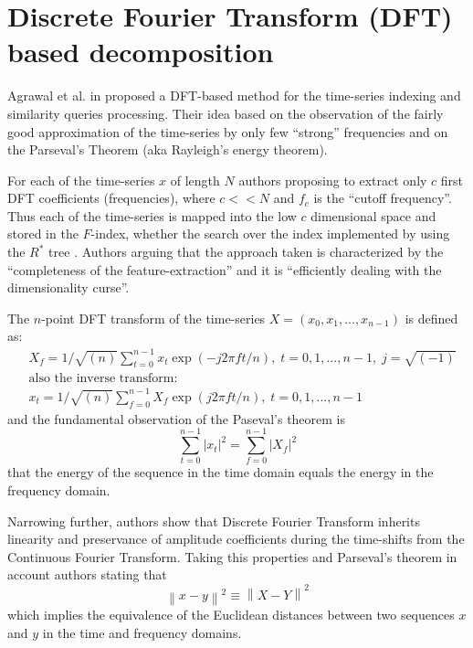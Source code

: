 \section{Discrete Fourier Transform (DFT) based decomposition}
Agrawal et al. in \cite{citeulike:3973409} proposed a DFT-based method for the time-series indexing and similarity queries processing. Their idea based on the observation of the fairly good approximation of the time-series by only few ``strong'' frequencies and on the Parseval's Theorem (aka Rayleigh's energy theorem). 

For each of the time-series $x$ of length $N$ authors proposing to extract only $c$ first DFT coefficients (frequencies), where $c<<N$ and $f_{c}$ is the ``cutoff frequency''. Thus each of the time-series is mapped into the low $c$ dimensional space and stored in the $F$-index, whether the search over the index implemented by using the $R^{*}$ tree \cite{citeulike:343069}. Authors arguing that the approach taken is characterized by the ``completeness of the feature-extraction'' and it is ``efficiently dealing with the dimensionality curse''. 

The $n$-point DFT transform of the time-series $X=(x_{0}, x_{1}, ... , x_{n-1})$ is defined as:
\begin{align}
& X_{f} = 1/\sqrt{(n)}\sum_{t=0}^{n-1} x_{t} \exp(-j2 \pi f t/n),\; t=0,1,...,n-1, \; j=\sqrt{(-1)} \\
& \text{also the inverse transform:} \nonumber \\
& x_{t} = 1/\sqrt{(n)}\sum_{f=0}^{n-1} X_{f} \exp(j2 \pi f t/n),\; t=0,1,...,n-1 
\end{align}
and the fundamental observation of the Paseval's theorem is
\begin{equation}
\sum_{t=0}^{n-1} \left| x_{t} \right| ^{2} = \sum_{f=0}^{n-1} \left| X_{f} \right| ^{2}
\label{eq:parseval}
\end{equation}
that the energy of the sequence in the time domain equals the energy in the frequency domain.

Narrowing further, authors show that Discrete Fourier Transform inherits linearity and preservance of amplitude coefficients during the time-shifts from the Continuous Fourier Transform. Taking this properties and Parseval's theorem in account authors stating that
\begin{equation}
\left\| x - y \right\| ^{2} \equiv \left\| X - Y \right\| ^{2}
\label{eq:dft_similarity}
\end{equation}
which implies the equivalence of the Euclidean distances between two sequences $x$ and $y$ in the time and frequency domains. 

